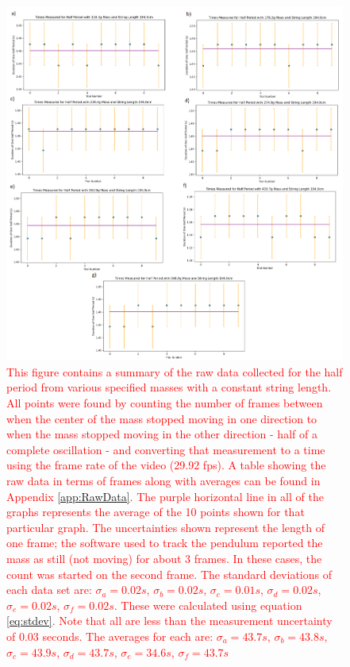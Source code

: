 \documentclass[11pt]{article}
\begin{document}
        \begin{figure}[H]
            \includegraphics[width = \textwidth]{AllRawMassTimes.PNG}
            \caption{\textcolor{red}{This figure contains a summary of the raw data collected for the half period from various specified masses with a  constant string length. All points were found by counting the number of frames between when the center of the mass stopped moving in one direction to when the mass stopped moving in the other direction - half of a complete oscillation - and converting that measurement to a time using the frame rate of the video (29.92 fps). A table showing the raw data in terms of frames along with averages can be found in Appendix \ref{app:RawData}. The purple horizontal line in all of the graphs represents the average of the 10 points shown for that particular graph. The uncertainties shown represent the length of one frame; the software used to track the pendulum reported the mass as still (not moving) for about 3 frames. In these cases, the count was started on the second frame. The standard deviations of each data set are: $\sigma_a = 0.02s$, $\sigma_b = 0.02s$, $\sigma_c = 0.01s$, $\sigma_d = 0.02s$, $\sigma_e = 0.02s$, $\sigma_f = 0.02s$. These were calculated using equation \ref{eq:stdev}. Note that all are less than the measurement uncertainty of 0.03 seconds. The averages for each are: $\sigma_a = 43.7s$, $\sigma_b = 43.8s$, $\sigma_c = 43.9s$, $\sigma_d = 43.7s$, $\sigma_e = 34.6s$, $\sigma_f = 43.7s$}}
            \label{fig:RawMassData}
        \end{figure}
\end{document}
